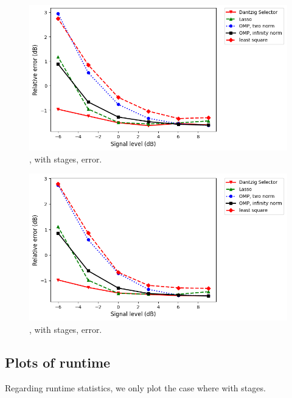 \begin {figure} [H]
\includegraphics [width = \textwidth] {error-big-tall-four.png}
\caption {, with  stages, error.}
\end {figure}

\begin {figure} [H]
\includegraphics [width = \textwidth] {error-big-wide-four.png}
\caption {, with  stages, error.}
\end {figure}


\subsection {Plots of runtime}

Regarding runtime statistics, we only plot the case where  with  stages.

